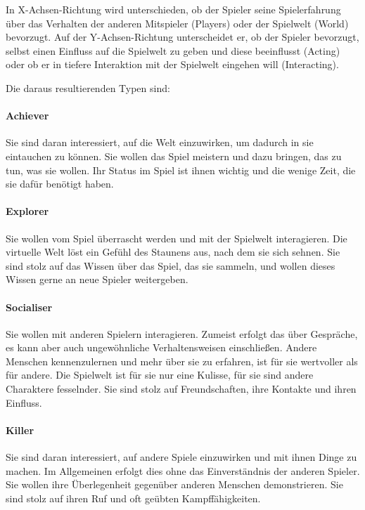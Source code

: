 In X-Achsen-Richtung wird unterschieden, ob der Spieler seine Spielerfahrung über das Verhalten der anderen Mitspieler (Players) oder der Spielwelt (World) bevorzugt. Auf der Y-Achsen-Richtung unterscheidet er, ob der Spieler bevorzugt, selbst einen Einfluss auf die Spielwelt zu geben und diese beeinflusst (Acting) oder ob er in tiefere Interaktion mit der Spielwelt eingehen will (Interacting).

Die daraus resultierenden Typen sind:
\paragraph{Achiever}
Sie sind daran interessiert, auf die Welt einzuwirken, um dadurch in sie eintauchen zu können. Sie wollen das Spiel meistern und dazu bringen, das zu tun, was sie wollen. Ihr Status im Spiel ist ihnen wichtig und die wenige Zeit, die sie dafür benötigt haben.

\paragraph{Explorer}
Sie wollen vom Spiel überrascht werden und mit der Spielwelt interagieren. Die virtuelle Welt löst ein Gefühl des Staunens aus, nach dem sie sich sehnen. Sie sind stolz auf das Wissen über das Spiel, das sie sammeln, und wollen dieses Wissen gerne an neue Spieler weitergeben.

\paragraph{Socialiser}
Sie wollen mit anderen Spielern interagieren. Zumeist erfolgt das über Gespräche, es kann aber auch ungewöhnliche Verhaltensweisen einschließen. Andere Menschen kennenzulernen und mehr über sie zu erfahren, ist für sie wertvoller als für andere. Die Spielwelt ist für sie nur eine Kulisse, für sie sind andere Charaktere fesselnder. Sie sind stolz auf Freundschaften, ihre Kontakte und ihren Einfluss.

\paragraph{Killer}
Sie sind daran interessiert, auf andere Spiele einzuwirken und mit ihnen Dinge zu machen. Im Allgemeinen erfolgt dies ohne das Einverständnis der anderen Spieler. Sie wollen ihre Überlegenheit gegenüber anderen Menschen demonstrieren. Sie sind stolz auf ihren Ruf und oft geübten Kampffähigkeiten.

